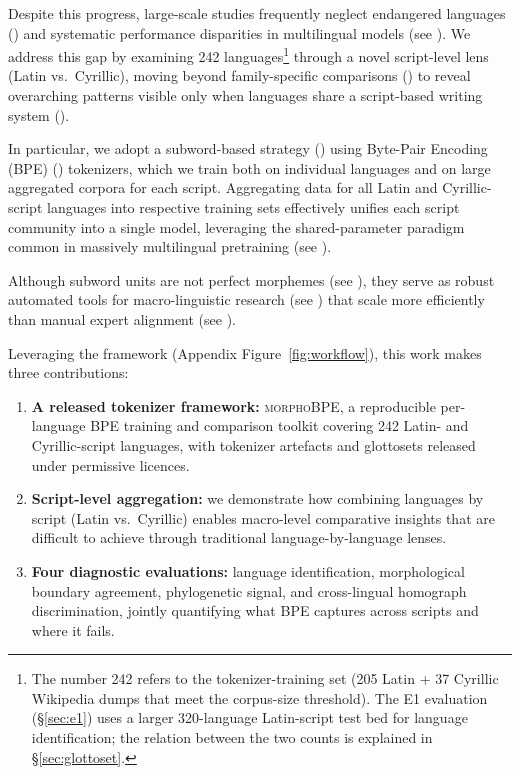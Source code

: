 \documentclass[11pt]{article}
\begin{document}
Despite this progress, large-scale studies frequently neglect endangered languages (\citealt{hamalainen2021endangered}) and systematic performance disparities in multilingual models (see \citealt{shani2026rootsperformancedisparitymultilingual, chelombitko2024qtokcomprehensiveframeworkevaluating, dunn2011evolved}). We address this gap by examining 242 languages\footnote{The number 242 refers to the tokenizer-training set (205 Latin + 37 Cyrillic Wikipedia dumps that meet the corpus-size threshold). The E1 evaluation (\S\ref{sec:e1}) uses a larger 320-language Latin-script test bed for language identification; the relation between the two counts is explained in \S\ref{sec:glottoset}.} through a novel script-level lens (Latin vs.\ Cyrillic), moving beyond family-specific comparisons (\citealt{meillet1967comparative, beekes2011comparative}) to reveal overarching patterns visible only when languages share a script-based writing system (\citealt{daniels2007world, rust-etal-2021-good}).

In particular, we adopt a subword-based strategy (\citealt{sennrich2016neural}) using Byte-Pair Encoding (BPE) (\citealt{10.5555/177910.177914}) tokenizers, which we train both on individual languages and on large aggregated corpora for each script. Aggregating data for all Latin and Cyrillic-script languages into respective training sets effectively unifies each script community into a single model, leveraging the shared-parameter paradigm common in massively multilingual pretraining (see \citealt{johnson2016google, conneau-etal-2020-unsupervised}).

Although subword units are not perfect morphemes (see \citealt{sennrich2016neural, bostrom2020bytepairencodingsuboptimal}), they serve as robust automated tools for macro-linguistic research (see \citealt{khurana2024crosslingual, pham-etal-2024-unibridge, futrell2015dependency}) that scale more efficiently than manual expert alignment (see \citealt{campbell2020, rama2018automatic, ciobanu2014cognates}).

Leveraging the framework (Appendix Figure~\ref{fig:workflow}), this work makes three contributions:
\begin{enumerate}
\item \textbf{A released tokenizer framework:} \textsc{morphoBPE}, a reproducible per-language BPE training and comparison toolkit covering 242 Latin- and Cyrillic-script languages, with tokenizer artefacts and glottosets released under permissive licences.
\item \textbf{Script-level aggregation:} we demonstrate how combining languages by script (Latin vs.\ Cyrillic) enables macro-level comparative insights that are difficult to achieve through traditional language-by-language lenses.
\item \textbf{Four diagnostic evaluations:} language identification, morphological boundary agreement, phylogenetic signal, and cross-lingual homograph discrimination, jointly quantifying what BPE captures across scripts and where it fails.
\end{enumerate}
\end{document}
